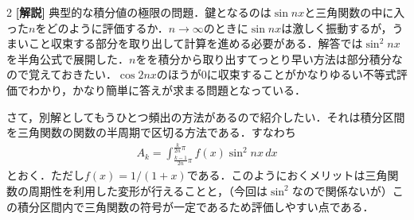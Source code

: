 \documentclass[../../main.tex]{subfiles}
\begin{document}
\begin{multicols}{2}
  \vspace{10pt}
  {\bf[解説]}
  典型的な積分値の極限の問題．鍵となるのは$\sin nx$と三角関数の中に入った$n$をどのように評価するか．$n\to\infty$のときに$\sin nx$は激しく振動するが，うまいこと収束する部分を取り出して計算を進める必要がある．解答では$\sin^2 nx$を半角公式で展開した．$n$をを積分から取り出すてっとり早い方法は部分積分なので覚えておきたい．$\cos 2nx$のほうが$0$に収束することがかなりゆるい不等式評価でわかり，かなり簡単に答えが求まる問題となっている．

  さて，別解としてもうひとつ頻出の方法があるので紹介したい．それは積分区間を三角関数の関数の半周期で区切る方法である．すなわち
  \begin{align*}
    A_k = \int_{\frac{k-1}{2n}\pi}^{\frac{k}{2n}\pi} f(x) \sin^2 nx \, dx
  \end{align*}
  とおく．ただし$f(x)=1/(1+x)$である．このようにおくメリットは三角関数の周期性を利用した変形が行えることと，（今回は$\sin^2$なので関係ないが）この積分区間内で三角関数の符号が一定であるため評価しやすい点である．


\end{multicols}
\end{document}
